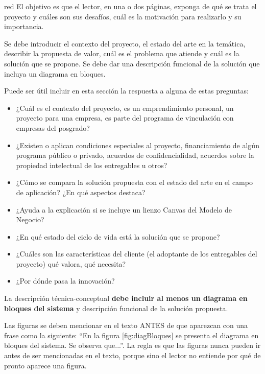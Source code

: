 \documentclass[
11pt, %
codirector, %
]{charter}
\begin{document}
\begin{consigna}{red} %
El objetivo es que el lector, en una o dos páginas, exponga de qué se trata el proyecto y cuáles son sus desafíos, cuál es la motivación para realizarlo y su importancia.

Se debe introducir el contexto del proyecto, el estado del arte en la temática, describir la propuesta de valor, cuál es el problema que atiende y cuál es la solución que se propone. Se debe dar una descripción funcional de la solución que incluya un diagrama en bloques.

Puede ser útil incluir en esta sección la respuesta a alguna de estas preguntas:

\begin{itemize}
	\item ¿Cuál es el contexto del proyecto, es un emprendimiento personal, un proyecto para una empresa, es parte del programa de vinculación con empresas del posgrado?
	\item ¿Existen o aplican condiciones especiales al proyecto, financiamiento de algún programa público o privado, acuerdos de confidencialidad, acuerdos sobre la propiedad intelectual de los entregables u otros?
	\item ¿Cómo se compara la solución propuesta con el estado del arte en el campo de aplicación? ¿En qué aspectos destaca?
	\item ¿Ayuda a la explicación si se incluye un lienzo Canvas del Modelo de Negocio?
	\item ¿En qué estado del ciclo de vida está la solución que se propone?
	\item ¿Cuáles son las características del cliente (el adoptante de los entregables del proyecto) qué valora, qué necesita?
	\item ¿Por dónde pasa la innovación?
\end{itemize}

La descripción técnica-conceptual \textbf{debe incluir al menos un diagrama en bloques del sistema} y descripción funcional de la solución propuesta.

Las figuras se deben mencionar en el texto ANTES de que aparezcan con una frase como la siguiente: ``En la figura \ref{fig:diagBloques} se presenta el diagrama en bloques del sistema. Se observa que...''.  La regla es que las figuras nunca pueden ir antes de ser mencionadas en el texto, porque sino el lector no entiende por qué de pronto aparece una figura.


\end{consigna}
\end{document}
